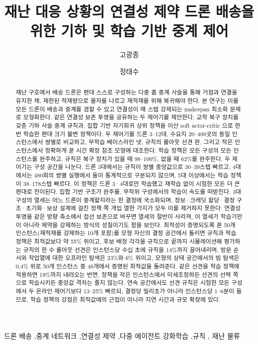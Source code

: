 \documentclass[final,5p,times,twocolumn]{elsarticle}
\begin{document}
\begin{frontmatter}

\title{재난 대응 상황의 연결성 제약 드론 배송을 위한 기하 및 학습 기반 중계 제어}

\author[ku]{고광종}
\author[ku]{정태수}

\begin{abstract}
재난 구호에서 배송 드론은 편대 스스로 구성하는 다중 홉 중계 사슬을 통해 거점과 연결을 유지한
채, 제한된 적재량으로 물자를 나르고 재적재를 위해 복귀해야 한다. 본 연구는 이를 모든 드론이 배송과
중계를 겸할 수 있고 연결성이 매 스텝 강제되는 makespan 최소화 문제로 모형화한다. 같은
연결성 보존 투영을 공유하는 두 제어기를 제안한다. 교착 복구 장치를 갖춘 기하 사슬 중계 규칙과,
집합 기반 자기회귀 상위 정책을 이산 soft actor-critic 으로 한 번 학습한 편대 크기 불변 정책이다.
두 제어기를 드론 3--12대, 수요지 20--400곳의 동일 인스턴스에서 쌍별로 비교하고, 무학습 베이스라인
넷, 규칙의 롤아웃 선견 판, 그리고 작은 인스턴스에서 정확하게 푼 시간 확장 참조 모형에 대조한다. 학습 정책은 모든 구성의 모든
인스턴스를 완주하고, 규칙은 복구 장치가 있을 때 98--100\%, 없을 때 62\%를 완주한다. 두 제어기는
구성 공간을 나눈다. 드론 3대에서는 규칙이 쌍별 중앙값으로 30--39스텝 빠르고, 4대에서는 480회의
쌍별 실행에서 둘이 통계적으로 구분되지 않으며, 5대 이상에서는 학습 정책이 38--178스텝 빠르다. 이
정책은 드론 3·4대로만 학습했고 재학습 없이 시험한 모든 더 큰 편대로 전이된다. 집합 기반 구조가
완주를, 무작위 구성에서의 학습이 속도를 떠받친다. 3대 구성의 열세는 어느 드론이 중계할지라는 한
결정에 국소화되며, 정보·크레딧 할당·결정 구조·초기화·보상 설계에 걸친 정책 쪽 개입 열한 가지가
모두 이를 제거하지 못한다. 연결성 투영을 같은 방향 축소에서 접선 보존으로 바꾸면 열세의 절반이
사라져, 이 열세가 학습기만이 아니라 제약을 강제하는 방식의 성질이기도 함을 보인다. 최적성이
증명되도록 푼 50개 인스턴스(재적재를 강제하는 10개 포함)를 모형 자신의 결정 공간에서 돌리면 규칙과
학습 정책은 최적값보다 약 55\% 위이고, 후보 배정 각각을 규칙으로 끝까지 시뮬레이션해 평가하는 규칙의
한 수 롤아웃 선견은 인스턴스당 수십 초에 규칙을 14\%까지 끌어내리며, 방문 순서와 작업열에 대한
오프라인 탐색은 23\%와 6\% 위이고, 모형의 상태 공간에서의 빔 탐색은 0.4\% 위로 50개 인스턴스 중
46개에서 증명된 최적값을 돌려준다. 같은 선견을 학습 정책에 적용하면 19\%까지 내려오는 반면, 정책을
작은 인스턴스에서 미세조정하든 선견의 선택 쪽으로 학습시키든 중앙값 격차는 줄지 않는다. 연속
공간에서도 선견 규칙은 시험한 모든 구성에서 두 온라인 제어기보다 13--25\% 빠르되, 결정당 밀리초가
아니라 인스턴스당 1--6분이 들므로, 학습 정책의 강점은 최적값에의 근접이 아니라 지연 시간과 규모
확장에 있다.
\end{abstract}

\begin{keyword}
드론 배송 \sep 중계 네트워크 \sep 연결성 제약 \sep 다중 에이전트 강화학습 \sep 규칙 \sep
재난 물류
\end{keyword}

\end{frontmatter}
\end{document}
